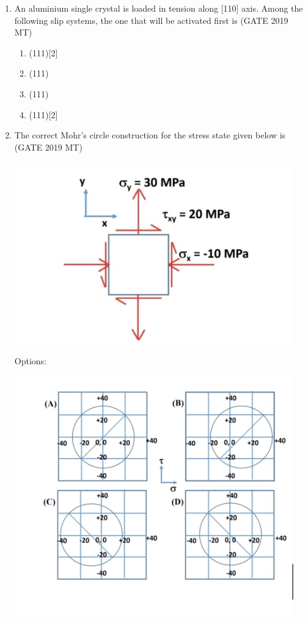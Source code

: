 \documentclass[12pt]{article}
\begin{document}
\begin{enumerate}
\item An aluminium single crystal is loaded in tension along [110] axis. Among the following slip systems, the one that will be activated first is (GATE 2019 MT)
\begin{enumerate}[label=(\alph*)]
    \item (111)[2]
    \item (111)
    \item (111)
    \item (111)[2]
\end{enumerate}

\item The correct Mohr’s circle construction for the stress state given below is (GATE 2019 MT)
\begin{center}
    \includegraphics[width=0.95\textwidth]{images/qq33i.jpg}
\end{center}
Options:
\begin{center}
    \includegraphics[width=0.95\textwidth]{images/qq33oi.jpg}
\end{center}


\end{enumerate}
\end{document}
